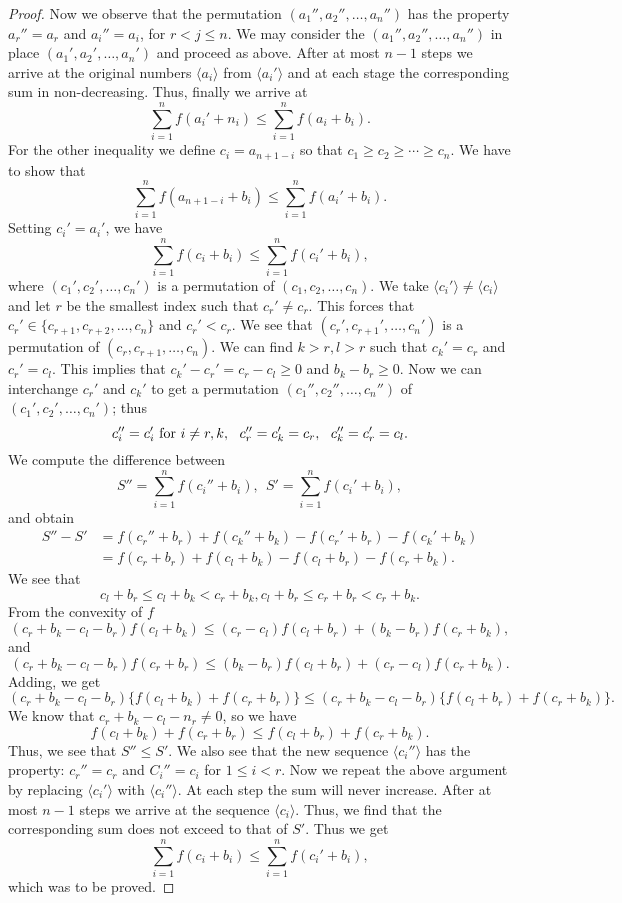 \begin{proof}
  Now we observe that the permutation $(a_1'', a_2'', \ldots, a_n'')$ has the property $a_r''=a_r$ and $a_i'' = a_i$, for $r <
  j\leq n$. We may consider the $(a_1'', a_2'', \ldots, a_n'')$ in place $(a_1', a_2', \ldots, a_n')$ and proceed as above. After
  at most $n-1$ steps we arrive at the original numbers $\langle a_i\rangle$ from $\langle a_i'\rangle$ and at each stage the
  corresponding sum in non-decreasing. Thus, finally we arrive at
  $$\sum_{i=1}^nf(a_i' + n_i)\leq \sum_{i=1}^nf(a_i + b_i).$$
  For the other inequality we define $c_i = a_{n+1-i}$ so that $c_1\geq c_2\geq\cdots\geq c_n$. We have to show that
  $$\sum_{i=1}^nf(a_{n+1-i} + b_i)\leq\sum_{i=1}^nf(a_i' + b_i).$$
  Setting $c_i' = a_i'$, we have
  $$\sum_{i=1}^nf(c_i + b_i)\leq\sum_{i=1}^nf(c_i' + b_i),$$
  where $(c_1', c_2', \ldots, c_n')$ is a permutation of $(c_1, c_2, \ldots, c_n)$. We take $\langle c_i'\rangle\neq\langle
  c_i\rangle$ and let $r$ be the smallest index such that $c_r'\neq c_r$. This forces that $c_r'\in\{c_{r+1}, c_{r+2},\ldots,
  c_n\}$ and $c_r'<c_r$. We see that $(c_r', c_{r+1}', \ldots, c_n')$ is a permutation of $(c_r, c_{r+1}, \ldots, c_n)$. We can
  find $k>r, l>r$ such that $c_k' = c_r$ and $c_r' = c_l$. This implies that $c_k' - c_r' = c_r - c_l\geq 0$ and $b_k - b_r\geq
  0$. Now we can interchange $c_r'$ and $c_k'$ to get a permutation $(c_1'', c_2'', \ldots, c_n'')$ of $(c_1', c_2', \ldots,
  c_n')$; thus
  $$c_i''=c_i'\text{~{\rm{for}}~}i\neq r, k,~~c_r''=c_k' = c_r,~~c_k''=c_r'=c_l.$$
  We compute the difference between
  $$S'' = \sum_{i=1}^nf(c_i'' + b_i),~~S'=\sum_{i=1}^nf(c_i' + b_i),$$
  and obtain
  $$\begin{aligned}S'' - S'& = f(c_r'' + b_r) + f(c_k'' + b_k) - f(c_r' + b_r) - f(c_k' + b_k)\\& = f(c_r + b_r) + f(c_l + b_k) -
    f(c_l + b_r) - f(c_r + b_k).\end{aligned}$$
  We see that
  $$c_l + b_r \leq c_l + b_k < c_r + b_k, c_l + b_r\leq c_r + b_r < c_r + b_k.$$
  From the convexity of $f$
  $$(c_r + b_k - c_l - b_r)f(c_l + b_k)\leq(c_r - c_l)f(c_l + b_r) + (b_k - b_r)f(c_r + b_k),$$
  and
  $$(c_r + b_k - c_l - b_r)f(c_r + b_r)\leq(b_k - b_r)f(c_l + b_r) + (c_r - c_l)f(c_r + b_k).$$
  Adding, we get
  $$(c_r + b_k - c_l - b_r)\{f(c_l + b_k) + f(c_r + b_r)\}\leq(c_r + b_k - c_l - b_r)\{f(c_l + b_r) + f(c_r + b_k)\}.$$
  We know that $c_r + b_k - c_l - n_r \neq 0$, so we have
  $$f(c_l + b_k) + f(c_r + b_r)\leq f(c_l + b_r) + f(c_r + b_k).$$
  Thus, we see that $S''\leq S'$. We also see that the new sequence $\langle c_i''\rangle$ has the property: $c_r'' = c_r$ and
  $C_i'' = c_i$ for $1\leq i< r$. Now we repeat the above argument by replacing $\langle c_i'\rangle$ with $\langle
  c_i''\rangle$. At each step the sum will never increase. After at most $n-1$ steps we arrive at the sequence $\langle
  c_i\rangle$. Thus, we find that the corresponding sum does not exceed to that of $S'$. Thus we get
  $$\sum_{i=1}^nf(c_i + b_i)\leq\sum_{i=1}^nf(c_i' + b_i),$$ which was to be proved.
\end{proof}

